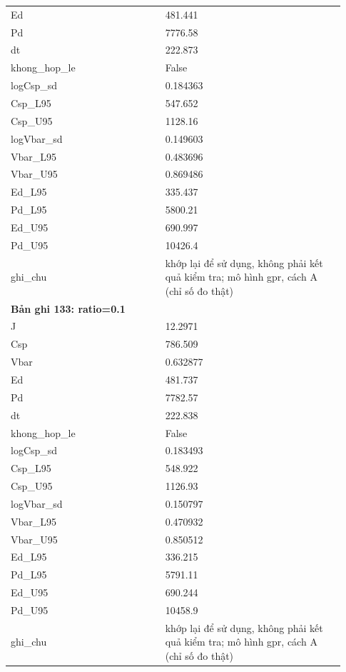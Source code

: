 \begin{longtable}{p{0.43\linewidth}p{0.50\linewidth}}
Ed & 481.441 \\
Pd & 7776.58 \\
dt & 222.873 \\
khong\_\allowbreak hop\_\allowbreak le & False \\
logCsp\_\allowbreak sd & 0.184363 \\
Csp\_\allowbreak L95 & 547.652 \\
Csp\_\allowbreak U95 & 1128.16 \\
logVbar\_\allowbreak sd & 0.149603 \\
Vbar\_\allowbreak L95 & 0.483696 \\
Vbar\_\allowbreak U95 & 0.869486 \\
Ed\_\allowbreak L95 & 335.437 \\
Pd\_\allowbreak L95 & 5800.21 \\
Ed\_\allowbreak U95 & 690.997 \\
Pd\_\allowbreak U95 & 10426.4 \\
ghi\_\allowbreak chu & khớp lại để sử dụng, không phải kết quả kiểm tra; mô hình gpr, cách A (chỉ số đo thật) \\
\midrule
\multicolumn{2}{p{0.95\linewidth}}{\textbf{Bản ghi 133: ratio=0.1}} \\
J & 12.2971 \\
Csp & 786.509 \\
Vbar & 0.632877 \\
Ed & 481.737 \\
Pd & 7782.57 \\
dt & 222.838 \\
khong\_\allowbreak hop\_\allowbreak le & False \\
logCsp\_\allowbreak sd & 0.183493 \\
Csp\_\allowbreak L95 & 548.922 \\
Csp\_\allowbreak U95 & 1126.93 \\
logVbar\_\allowbreak sd & 0.150797 \\
Vbar\_\allowbreak L95 & 0.470932 \\
Vbar\_\allowbreak U95 & 0.850512 \\
Ed\_\allowbreak L95 & 336.215 \\
Pd\_\allowbreak L95 & 5791.11 \\
Ed\_\allowbreak U95 & 690.244 \\
Pd\_\allowbreak U95 & 10458.9 \\
ghi\_\allowbreak chu & khớp lại để sử dụng, không phải kết quả kiểm tra; mô hình gpr, cách A (chỉ số đo thật) \\

\end{longtable}
